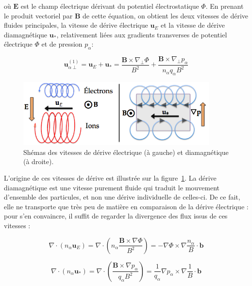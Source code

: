 \begin{refsection}
où $\mathbf E$ est le champ électrique dérivant du potentiel électrostatique
$\Phi$. En prenant le produit vectoriel par $\mathbf B$ de cette équation, on
obtient les deux vitesses de dérive fluides principales, la vitesse de dérive
électrique $\mathbf u_E$ et la vitesse de dérive diamagnétique $\mathbf u_*$,
relativement liées aux gradients transverses de potentiel électrique $\Phi$ et
de pression $p_\alpha$:

\begin{equation}
\label{1-eqVitessesDerive}
\mathbf u_{\alpha\perp}^{(1)}=\mathbf u_E+\mathbf u_*=\frac{\mathbf
B\times\nabla_\perp \Phi}{B^2}+\frac{\mathbf B\times\nabla_\perp
p_\alpha}{n_\alpha q_\alpha B^2}
\end{equation}

\begin{figure}[!htbp]
    \centering
	\includegraphics[width=0.9\textwidth]{figures/1-vitessesDerive.png}
	\caption{Shémas des vitesses de dérive électrique (à gauche) et diamagnétique
	(à droite).}
	\label{1-vitessesDerive}
\end{figure}

L'origine de ces vitesses de dérive est illustrée sur la
figure~\ref{1-vitessesDerive}. La dérive diamagnétique est une vitesse
purement fluide qui traduit le mouvement d'ensemble des particules, et non
une dérive individuelle de celles-ci. De ce fait, elle ne transporte que
très peu de matière en comparaison de la dérive électrique : pour s'en
convaincre, il suffit de regarder la divergence des flux issus de ces
vitesses :

\begin{equation}
\nabla\cdot\left(n_\alpha\mathbf
u_E\right)=\nabla\cdot\left(n_\alpha\frac{\mathbf B\times\nabla
\Phi}{B^2}\right) =-\nabla \Phi\times\nabla\frac{n_\alpha}{B}\cdot \mathbf b
\end{equation}

\begin{equation}
\nabla\cdot\left(n_\alpha\mathbf
u_*\right)=\nabla\cdot\left(\frac{\mathbf B\times\nabla
p_\alpha}{q_\alpha B^2}\right)
=\frac{1}{q_\alpha}\nabla p_\alpha\times\nabla\frac{1}{B}\cdot \mathbf b
\end{equation}


\end{refsection}
